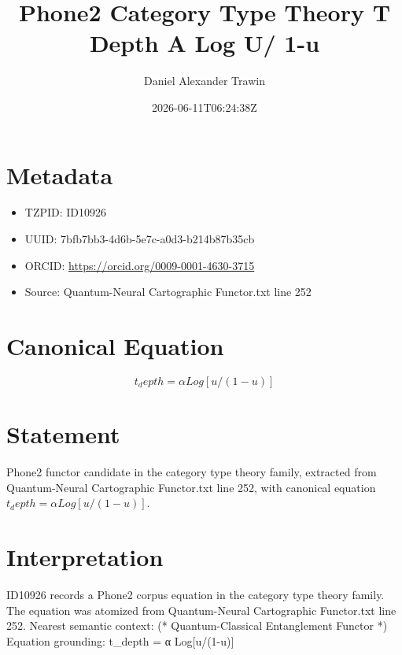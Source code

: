 \documentclass[11pt]{article}
\title{Phone2 Category Type Theory T Depth Α Log U/ 1-u}
\author{Daniel Alexander Trawin}
\date{2026-06-11T06:24:38Z}
\begin{document}
\maketitle
\section*{Metadata}
\begin{itemize}
\item TZPID: ID10926
\item UUID: 7bfb7bb3-4d6b-5e7c-a0d3-b214b87b35cb
\item ORCID: \url{https://orcid.org/0009-0001-4630-3715}
\item Source: Quantum-Neural Cartographic Functor.txt line 252
\end{itemize}
\section*{Canonical Equation}
\[
t_depth = α Log[u/(1-u)]
\]
\section*{Statement}
Phone2 functor candidate in the category type theory family, extracted from Quantum-Neural Cartographic Functor.txt line 252, with canonical equation $t_depth = α Log[u/(1-u)]$.
\section*{Interpretation}
ID10926 records a Phone2 corpus equation in the category type theory family. The equation was atomized from Quantum-Neural Cartographic Functor.txt line 252. Nearest semantic context: (* Quantum-Classical Entanglement Functor *) Equation grounding: t_depth = α Log[u/(1-u)]
\end{document}
